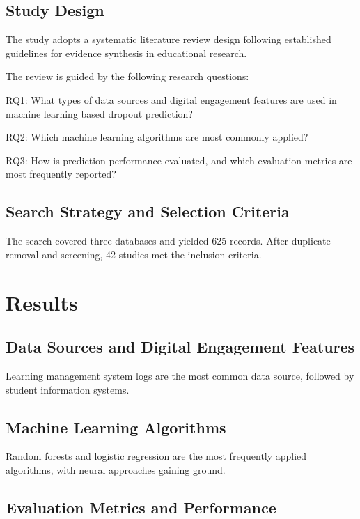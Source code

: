 \documentclass[12pt]{article}
\begin{document}
\subsection{Study Design}

The study adopts a systematic literature review design following established guidelines for evidence synthesis in educational research.

The review is guided by the following research questions:

RQ1: What types of data sources and digital engagement features are used in machine learning based dropout prediction?

RQ2: Which machine learning algorithms are most commonly applied?

RQ3: How is prediction performance evaluated, and which evaluation metrics are most frequently reported?

\subsection{Search Strategy and Selection Criteria}

The search covered three databases and yielded 625 records. After duplicate removal and screening, 42 studies met the inclusion criteria.

\section{Results}

\subsection{Data Sources and Digital Engagement Features}

Learning management system logs are the most common data source, followed by student information systems.

\subsection{Machine Learning Algorithms}

Random forests and logistic regression are the most frequently applied algorithms, with neural approaches gaining ground.

\subsection{Evaluation Metrics and Performance}
\end{document}
